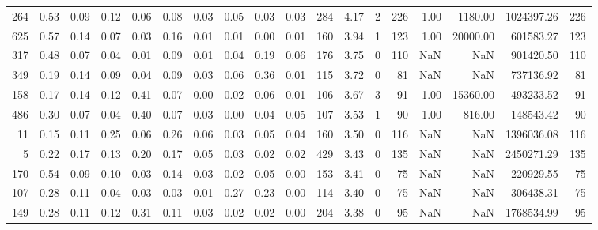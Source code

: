 \begin{tabular}{rrrrrrrrrrllrrrrrr}
          264 & 0.53 & 0.09 & 0.12 & 0.06 & 0.08 & 0.03 & 0.05 & 0.03 & 0.03 & 284 &  4.17 &                  2 &       226 &            1.00 &             1180.00 &    1024397.26 &                   226 \\
          625 & 0.57 & 0.14 & 0.07 & 0.03 & 0.16 & 0.01 & 0.01 & 0.00 & 0.01 & 160 &  3.94 &                  1 &       123 &            1.00 &            20000.00 &     601583.27 &                   123 \\
          317 & 0.48 & 0.07 & 0.04 & 0.01 & 0.09 & 0.01 & 0.04 & 0.19 & 0.06 & 176 &  3.75 &                  0 &       110 &             NaN &                 NaN &     901420.50 &                   110 \\
          349 & 0.19 & 0.14 & 0.09 & 0.04 & 0.09 & 0.03 & 0.06 & 0.36 & 0.01 & 115 &  3.72 &                  0 &        81 &             NaN &                 NaN &     737136.92 &                    81 \\
          158 & 0.17 & 0.14 & 0.12 & 0.41 & 0.07 & 0.00 & 0.02 & 0.06 & 0.01 & 106 &  3.67 &                  3 &        91 &            1.00 &            15360.00 &     493233.52 &                    91 \\
          486 & 0.30 & 0.07 & 0.04 & 0.40 & 0.07 & 0.03 & 0.00 & 0.04 & 0.05 & 107 &  3.53 &                  1 &        90 &            1.00 &              816.00 &     148543.42 &                    90 \\
           11 & 0.15 & 0.11 & 0.25 & 0.06 & 0.26 & 0.06 & 0.03 & 0.05 & 0.04 & 160 &  3.50 &                  0 &       116 &             NaN &                 NaN &    1396036.08 &                   116 \\
            5 & 0.22 & 0.17 & 0.13 & 0.20 & 0.17 & 0.05 & 0.03 & 0.02 & 0.02 & 429 &  3.43 &                  0 &       135 &             NaN &                 NaN &    2450271.29 &                   135 \\
          170 & 0.54 & 0.09 & 0.10 & 0.03 & 0.14 & 0.03 & 0.02 & 0.05 & 0.00 & 153 &  3.41 &                  0 &        75 &             NaN &                 NaN &     220929.55 &                    75 \\
          107 & 0.28 & 0.11 & 0.04 & 0.03 & 0.03 & 0.01 & 0.27 & 0.23 & 0.00 & 114 &  3.40 &                  0 &        75 &             NaN &                 NaN &     306438.31 &                    75 \\
          149 & 0.28 & 0.11 & 0.12 & 0.31 & 0.11 & 0.03 & 0.02 & 0.02 & 0.00 & 204 &  3.38 &                  0 &        95 &             NaN &                 NaN &    1768534.99 &                    95 \\

\end{tabular}
